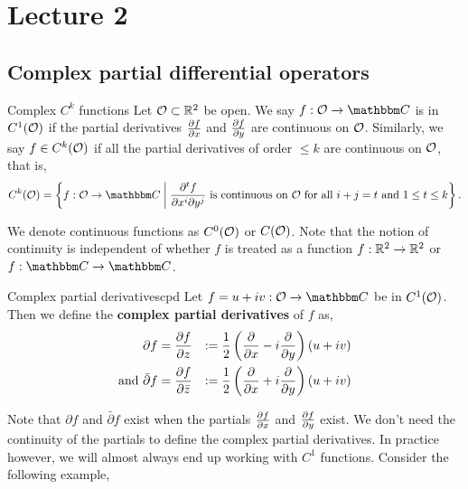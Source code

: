 \documentclass[../ComplexAnalysis_Notes.tex]{subfiles}
\begin{document}
\chapter*{Lecture 2} %
\setcounter{chapter}{2} %
\setcounter{section}{0}
\setcounter{equation}{0}
\setcounter{figure}{0}


\section{Complex partial differential operators}

\begin{Def}{Complex \(C^k\) functions}{}
  Let \(\mathcal{O} \subset \mathbb{R}^2\) be open. We say \(f : \mO \to \C\) is in \(C^1(\mathcal{O})\) if the partial derivatives \(\pdv{f}{x}\) and \(\pdv{f}{y}\) are continuous on \(\mathcal{O}\). Similarly, we say \(f \in C^k(\mathcal{O})\) if all the partial derivatives of order \(\leq k\) are continuous on \(\mathcal{O}\), that is,
  \[
    C^k(\mO) = \left\{ f : \mO \to \C \;\bigg\rvert\; \frac{\partial^t f}{\partial x^i \partial y^j} \text{ is continuous on } \mO \text{ for all } i+j = t \text{ and } 1 \leq t \leq k  \right\}.
  \]
\end{Def}

We denote continuous functions as \(C^0(\mathcal{O})\) or \(C(\mathcal{O})\). Note that the notion of continuity is independent of whether $f$ is treated as a function \(f:\mathbb{R}^2 \to \mathbb{R}^2\) or \(f:\C \to \C\).

\begin{Def}{Complex partial derivatives}{cpd}
  Let \(f = u + iv : \mO\to \C\) be in \(C^1(\mathcal{O})\). Then we define the \textbf{complex partial derivatives} of \(f\) as,
  \begin{alignat*}{2}
    {\partial f}                   & = \pdv{f}{z}       & := \frac 12 \left( \pdv{x} - i \pdv{y} \right)(u + iv) \\
    \text{and } {\bar{\partial} f} & = \pdv{f}{\bar{z}} & := \frac 12 \left( \pdv{x} + i \pdv{y} \right)(u + iv)
  \end{alignat*}
\end{Def}

Note that \({\partial f}\) and \({\bar{\partial} f}\) exist when the partials \(\pdv{f}{x}\) and \(\pdv{f}{y}\) exist. We don't need the continuity of the partials to define the complex partial derivatives. In practice however, we will almost always end up working with \(C^1\) functions. Consider the following example,
\end{document}
